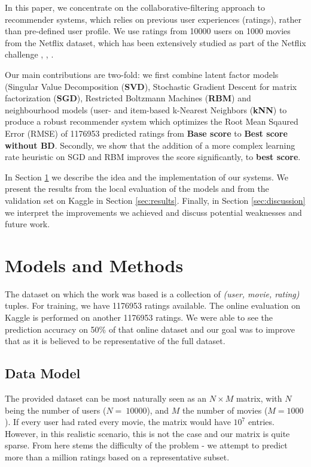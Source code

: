 \documentclass[10pt,conference,compsocconf]{IEEEtran}
\begin{document}
	In this paper, we concentrate on the collaborative-filtering approach to recommender systems, which relies on previous user experiences (ratings), rather than pre-defined user profile. We use ratings from 10000 users on 1000 movies from the Netflix dataset, which has been extensively studied as part of the Netflix challenge \cite{SMH07}, \cite{Koren09matrixfactorization}, \cite{funk2011netflix}.
	
	Our main contributions are two-fold: we first combine latent factor models (Singular Value Decomposition (\textbf{SVD}), Stochastic Gradient Descent for matrix factorization (\textbf{SGD}), Restricted Boltzmann Machines (\textbf{RBM}) and neighbourhood models (user- and item-based k-Nearest Neighbors (\textbf{kNN}) to produce a robust recommender system which optimizes the Root Mean Sqaured Error (RMSE) of 1176953 predicted ratings from \textbf{Base score} to \textbf{Best score without BD}. Secondly, we show that the addition of a more complex learning rate heuristic on SGD and RBM improves the score significantly, to \textbf{best score}. 
	
	In Section \ref{sec:models} we describe the idea and the implementation of our systems. We present the results from the local evaluation of the models and from the validation set on Kaggle in Section \ref{sec:results}. Finally, in Section \ref{sec:discussion} we interpret the improvements we achieved and discuss potential weaknesses and future work.
	
	
	\section{Models and Methods}
	\label{sec:models}
	The dataset on which the work was based is a collection of \textit{(user, movie, rating)} tuples. For training, we have 1176953 ratings available. The online evaluation on Kaggle is performed on another 1176953 ratings. We were able to see the prediction accuracy on 50\% of that online dataset and our goal was to improve that as it is believed to be representative of the full dataset.
	\subsection{Data Model}
	
	The provided dataset can be most naturally seen as an $N\times M$ matrix, with $N$ being the number of users ($N=~10000$), and $M$ the number of movies ($M=1000$). If every user had rated every movie, the matrix would have $10^7$ entries. However, in this realistic scenario, this is not the case and our matrix is quite sparse. From here stems the difficulty of the problem - we attempt to predict more than a million ratings based on a representative subset. 
	
\end{document}
